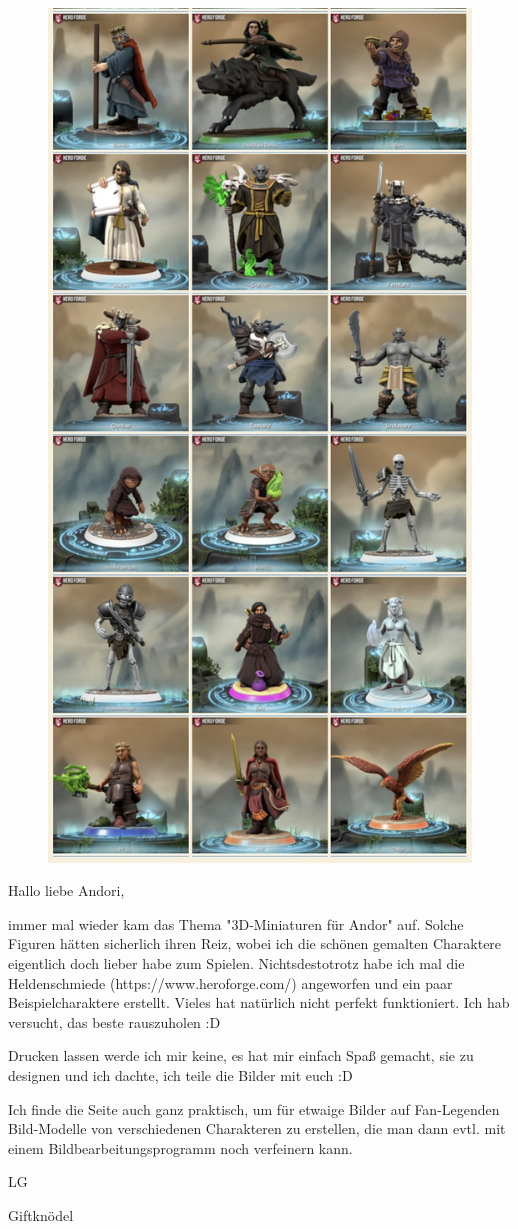 {\begin{figure}[ht!]
    \includegraphics[width=0.3\linewidth]{Das Erbe des Wunderkindes/Bilder/3D mit der Heldenschmiede 4.jpg}
\end{figure}

Hallo liebe Andori,\bigskip

immer mal wieder kam das Thema "3D-Miniaturen für Andor" auf. Solche Figuren hätten sicherlich ihren Reiz, wobei ich die schönen gemalten Charaktere eigentlich doch lieber habe zum Spielen. Nichtsdestotrotz habe ich mal die Heldenschmiede (https://www.heroforge.com/) angeworfen und ein paar Beispielcharaktere erstellt. Vieles hat natürlich nicht perfekt funktioniert. Ich hab versucht, das beste rauszuholen :D

Drucken lassen werde ich mir keine, es hat mir einfach Spaß gemacht, sie zu designen und ich dachte, ich teile die Bilder mit euch :D

Ich finde die Seite auch ganz praktisch, um für etwaige Bilder auf Fan-Legenden Bild-Modelle von verschiedenen Charakteren zu erstellen, die man dann evtl. mit einem Bildbearbeitungsprogramm noch verfeinern kann.\bigskip

LG

Giftknödel


}